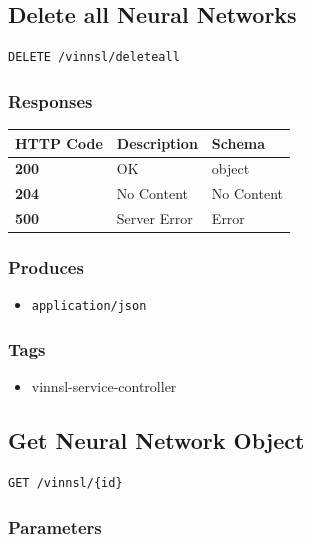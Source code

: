 \subsection{Delete all Neural
Networks}\label{delete-all-neural-networks}

\begin{verbatim}
DELETE /vinnsl/deleteall
\end{verbatim}

\subsubsection{Responses}\label{responses-2}

\begin{longtable}[]{@{}lll@{}}
\toprule
HTTP Code & Description & Schema\tabularnewline
\midrule
\endhead
\textbf{200} & OK & object\tabularnewline
\textbf{204} & No Content & No Content\tabularnewline
\textbf{500} & Server Error & Error\tabularnewline
\bottomrule
\end{longtable}

\subsubsection{Produces}\label{produces-2}

\begin{itemize}
\tightlist
\item
  \texttt{application/json}
\end{itemize}

\subsubsection{Tags}\label{tags-2}

\begin{itemize}
\tightlist
\item
  vinnsl-service-controller
\end{itemize}

\subsection{Get Neural Network Object}\label{get-neural-network-object}

\begin{verbatim}
GET /vinnsl/{id}
\end{verbatim}

\subsubsection{Parameters}\label{parameters-2}

